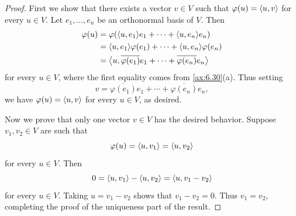 \begin{proof}
First we show that there exists a vector $v\in V$ such that
$\varphi(u)=\langle u, v \rangle$ for every $u\in V$. Let $e_1,\dots,e_n$ be an orthonormal
basis of $V$. Then
\begin{align*}
\varphi(u) &= \varphi(\langle u, e_1 \rangle e_1+\cdots+\langle u, e_n \rangle e_n)\\
  &= \langle u, e_1 \rangle\varphi(e_1)+\cdots+\langle u, e_n \rangle\varphi(e_n)\\
  &= \bigl\langle u, \overline{\varphi(e_1)}e_1+\cdots
     +\overline{\varphi(e_n)}e_n\bigr\rangle
\end{align*}
for every $u\in V$, where the first equality comes from \ref{ax:6.30}(a). Thus
setting\label{ax:6.43}
\[ v = \overline{\varphi(e_1)}e_1+\cdots+\overline{\varphi(e_n)}e_n,
   \tag*{\thetheorem} \]
we have $\varphi(u)=\langle u, v \rangle$ for every $u\in V$, as desired.

Now we prove that only one vector $v\in V$ has the desired behavior. Suppose
$v_1,v_2\in V$ are such that
\[ \varphi(u) = \langle u, v_1 \rangle = \langle u, v_2 \rangle \]
for every $u\in V$. Then
\[ 0 = \langle u, v_1 \rangle-\langle u, v_2 \rangle = \langle u, v_1-v_2 \rangle \]
for every $u\in V$. Taking $u=v_1-v_2$ shows that $v_1-v_2=0$. Thus $v_1=v_2$,
completing the proof of the uniqueness part of the result.
\end{proof}

